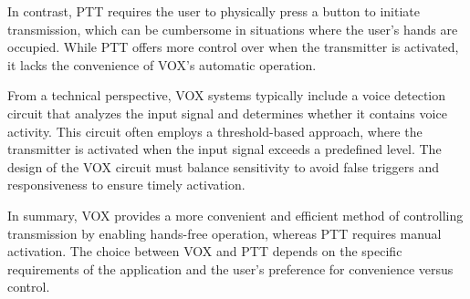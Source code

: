 In contrast, PTT requires the user to physically press a button to initiate transmission, which can be cumbersome in situations where the user's hands are occupied. While PTT offers more control over when the transmitter is activated, it lacks the convenience of VOX's automatic operation.

From a technical perspective, VOX systems typically include a voice detection circuit that analyzes the input signal and determines whether it contains voice activity. This circuit often employs a threshold-based approach, where the transmitter is activated when the input signal exceeds a predefined level. The design of the VOX circuit must balance sensitivity to avoid false triggers and responsiveness to ensure timely activation.

In summary, VOX provides a more convenient and efficient method of controlling transmission by enabling hands-free operation, whereas PTT requires manual activation. The choice between VOX and PTT depends on the specific requirements of the application and the user's preference for convenience versus control.

